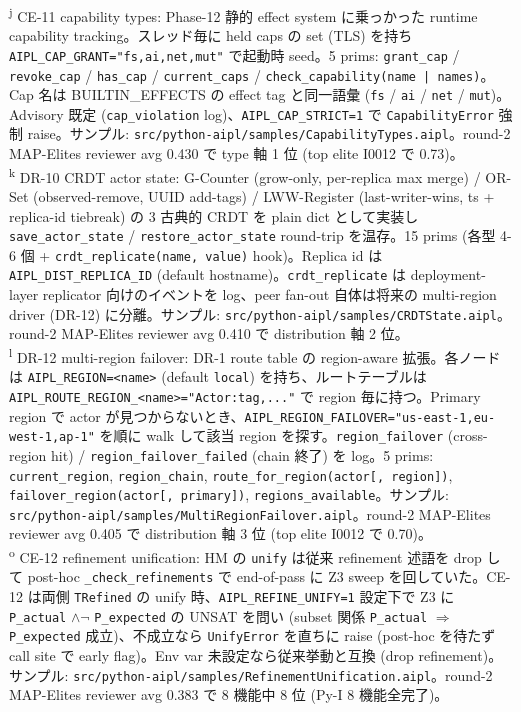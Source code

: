 \documentclass[10pt,a4paper,landscape]{article}
\begin{document}
\textsuperscript{j} \small CE-11 capability types: Phase-12 静的 effect system に乗っかった runtime capability tracking。スレッド毎に held caps の set (TLS) を持ち \texttt{AIPL\_CAP\_GRANT="fs,ai,net,mut"} で起動時 seed。5 prims: \texttt{grant\_cap} / \texttt{revoke\_cap} / \texttt{has\_cap} / \texttt{current\_caps} / \texttt{check\_capability(name | names)}。Cap 名は BUILTIN\_EFFECTS の effect tag と同一語彙 (\texttt{fs} / \texttt{ai} / \texttt{net} / \texttt{mut})。Advisory 既定 (\texttt{cap\_violation} log)、\texttt{AIPL\_CAP\_STRICT=1} で \texttt{CapabilityError} 強制 raise。サンプル: \texttt{src/python-aipl/samples/CapabilityTypes.aipl}。round-2 MAP-Elites reviewer avg 0.430 で type 軸 1 位 (top elite I0012 で 0.73)。\\
\textsuperscript{k} \small DR-10 CRDT actor state: G-Counter (grow-only, per-replica max merge) / OR-Set (observed-remove, UUID add-tags) / LWW-Register (last-writer-wins, ts + replica-id tiebreak) の 3 古典的 CRDT を plain dict として実装し \texttt{save\_actor\_state} / \texttt{restore\_actor\_state} round-trip を温存。15 prims (各型 4-6 個 + \texttt{crdt\_replicate(name, value)} hook)。Replica id は \texttt{AIPL\_DIST\_REPLICA\_ID} (default hostname)。\texttt{crdt\_replicate} は deployment-layer replicator 向けのイベントを log、peer fan-out 自体は将来の multi-region driver (DR-12) に分離。サンプル: \texttt{src/python-aipl/samples/CRDTState.aipl}。round-2 MAP-Elites reviewer avg 0.410 で distribution 軸 2 位。\\
\textsuperscript{l} \small DR-12 multi-region failover: DR-1 route table の region-aware 拡張。各ノードは \texttt{AIPL\_REGION=<name>} (default \texttt{local}) を持ち、ルートテーブルは \texttt{AIPL\_ROUTE\_REGION\_<name>="Actor:tag,..."} で region 毎に持つ。Primary region で actor が見つからないとき、\texttt{AIPL\_REGION\_FAILOVER="us-east-1,eu-west-1,ap-1"} を順に walk して該当 region を探す。\texttt{region\_failover} (cross-region hit) / \texttt{region\_failover\_failed} (chain 終了) を log。5 prims: \texttt{current\_region}, \texttt{region\_chain}, \texttt{route\_for\_region(actor[, region])}, \texttt{failover\_region(actor[, primary])}, \texttt{regions\_available}。サンプル: \texttt{src/python-aipl/samples/MultiRegionFailover.aipl}。round-2 MAP-Elites reviewer avg 0.405 で distribution 軸 3 位 (top elite I0012 で 0.70)。\\
\textsuperscript{o} \small CE-12 refinement unification: HM の \texttt{unify} は従来 refinement 述語を drop して post-hoc \texttt{\_check\_refinements} で end-of-pass に Z3 sweep を回していた。CE-12 は両側 \texttt{TRefined} の unify 時、\texttt{AIPL\_REFINE\_UNIFY=1} 設定下で Z3 に \texttt{P\_actual} $\land \neg$ \texttt{P\_expected} の UNSAT を問い (subset 関係 \texttt{P\_actual} $\Rightarrow$ \texttt{P\_expected} 成立)、不成立なら \texttt{UnifyError} を直ちに raise (post-hoc を待たず call site で early flag)。Env var 未設定なら従来挙動と互換 (drop refinement)。サンプル: \texttt{src/python-aipl/samples/RefinementUnification.aipl}。round-2 MAP-Elites reviewer avg 0.383 で 8 機能中 8 位 (Py-I 8 機能全完了)。\\
\end{document}
